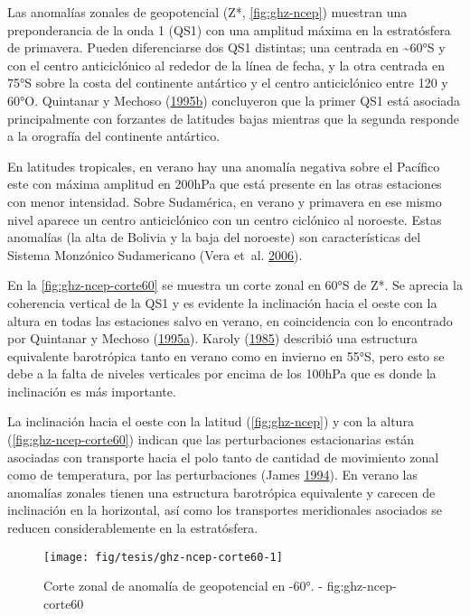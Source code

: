 \documentclass[spanish,a4paper]{book}
\begin{document}
Las anomalías zonales de geopotencial (Z*, \autoref{fig:ghz-ncep})
muestran una preponderancia de la onda 1 (QS1) con una amplitud máxima
en la estratósfera de primavera. Pueden diferenciarse dos QS1 distintas;
una centrada en \textasciitilde{}60°S y con el centro anticiclónico al
rededor de la línea de fecha, y la otra centrada en 75°S sobre la costa
del continente antártico y el centro anticiclónico entre 120 y 60°O.
Quintanar y Mechoso
(\protect\hyperlink{ref-Quintanar1995}{1995}\protect\hyperlink{ref-Quintanar1995}{b})
concluyeron que la primer QS1 está asociada principalmente con forzantes
de latitudes bajas mientras que la segunda responde a la orografía del
continente antártico.

En latitudes tropicales, en verano hay una anomalía negativa sobre el
Pacífico este con máxima amplitud en 200hPa que está presente en las
otras estaciones con menor intensidad. Sobre Sudamérica, en verano y
primavera en ese mismo nivel aparece un centro anticiclónico con un
centro ciclónico al noroeste. Estas anomalías (la alta de Bolivia y la
baja del noroeste) son características del Sistema Monzónico
Sudamericano (Vera et~al. \protect\hyperlink{ref-Vera2006}{2006}).

En la \autoref{fig:ghz-ncep-corte60} se muestra un corte zonal en 60°S
de Z*. Se aprecia la coherencia vertical de la QS1 y es evidente la
inclinación hacia el oeste con la altura en todas las estaciones salvo
en verano, en coincidencia con lo encontrado por Quintanar y Mechoso
(\protect\hyperlink{ref-Quintanar1995a}{1995}\protect\hyperlink{ref-Quintanar1995a}{a}).
Karoly (\protect\hyperlink{ref-Karoly1985}{1985}) describió una
estructura equivalente barotrópica tanto en verano como en invierno en
55°S, pero esto se debe a la falta de niveles verticales por encima de
los 100hPa que es donde la inclinación es más importante.

La inclinación hacia el oeste con la latitud (\autoref{fig:ghz-ncep}) y
con la altura (\autoref{fig:ghz-ncep-corte60}) indican que las
perturbaciones estacionarias están asociadas con transporte hacia el
polo tanto de cantidad de movimiento zonal como de temperatura, por las
perturbaciones (James \protect\hyperlink{ref-James}{1994}). En verano
las anomalías zonales tienen una estructura barotrópica equivalente y
carecen de inclinación en la horizontal, así como los transportes
meridionales asociados se reducen considerablemente en la estratósfera.

\begin{figure}

{\centering \texttt{[image: fig/tesis/ghz-ncep-corte60-1]} 

}

\caption{Corte zonal de anomalía de geopotencial en -60°. - fig:ghz-ncep-corte60}\label{fig:ghz-ncep-corte60}
\end{figure}
\end{document}
